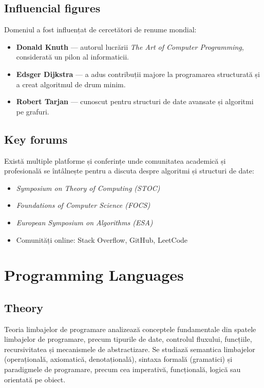 \documentclass[12pt, letterpaper]{article}
\begin{document}
\subsection*{Influencial figures}
Domeniul a fost influențat de cercetători de renume mondial:
\begin{itemize}
    \item \textbf{Donald Knuth} — autorul lucrării \textit{The Art of Computer Programming}, considerată un pilon al informaticii.
    \item \textbf{Edsger Dijkstra} — a adus contribuții majore la programarea structurată și a creat algoritmul de drum minim.
    \item \textbf{Robert Tarjan} — cunoscut pentru structuri de date avansate și algoritmi pe grafuri.
\end{itemize}

\subsection*{Key forums}
Există multiple platforme și conferințe unde comunitatea academică și profesională se întâlnește pentru a discuta despre algoritmi și structuri de date:
\begin{itemize}
    \item \textit{Symposium on Theory of Computing (STOC)}
    \item \textit{Foundations of Computer Science (FOCS)}
    \item \textit{European Symposium on Algorithms (ESA)}
    \item Comunități online: Stack Overflow, GitHub, LeetCode
\end{itemize}

\newpage

\section{Programming Languages}

\subsection*{Theory}
Teoria limbajelor de programare analizează conceptele fundamentale din spatele limbajelor de programare, precum tipurile de date, controlul fluxului, funcțiile, recursivitatea și mecanismele de abstractizare. Se studiază semantica limbajelor (operațională, axiomatică, denotațională), sintaxa formală (gramatici) și paradigmele de programare, precum cea imperativă, funcțională, logică sau orientată pe obiect.
\end{document}
